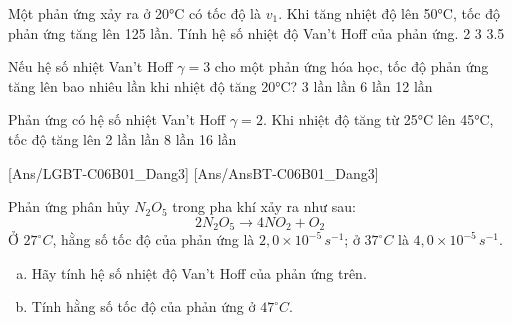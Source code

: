 \documentclass[Main.tex]{subfiles}
\begin{document}
\begin{ex}
	Một phản ứng xảy ra ở 20°C có tốc độ là $v_1$. Khi tăng nhiệt độ lên 50°C, tốc độ phản ứng tăng lên 125 lần. Tính hệ số nhiệt độ Van't Hoff của phản ứng.
	\choice
	{2}
	{}
	{3}
	{3.5}
\end{ex}
\begin{ex}
	Nếu hệ số nhiệt Van't Hoff $\gamma = 3$ cho một phản ứng hóa học, tốc độ phản ứng tăng lên bao nhiêu lần khi nhiệt độ tăng 20°C?
	\choice
	{3 lần}
	{ lần}
	{6 lần}
	{12 lần}
\end{ex}
\begin{ex}
	Phản ứng có hệ số nhiệt Van't Hoff $\gamma = 2$. Khi nhiệt độ tăng từ 25°C lên 45°C, tốc độ tăng lên
	\choice
	{2 lần}
	{ lần}
	{8 lần}
	{16 lần}
\end{ex}
[Ans/LGBT-C06B01_Dang3]
[Ans/AnsBT-C06B01_Dang3]
\begin{bt}
	Phản ứng phân hủy $N_2O_5$ trong pha khí xảy ra như sau:
	\[2N_2O_5 \rightarrow 4NO_2 + O_2\]
	Ở $27^\circ C$, hằng số tốc độ của phản ứng là $2{,}0 \times 10^{-5} \, s^{-1}$; ở $37^\circ C$ là $4{,}0 \times 10^{-5} \, s^{-1}$.
	\begin{enumerate}[a)]
		\item Hãy tính hệ số nhiệt độ Van't Hoff của phản ứng trên.
		\item Tính hằng số tốc độ của phản ứng ở $47^\circ C$.
	\end{enumerate}
\end{bt}
\end{document}
